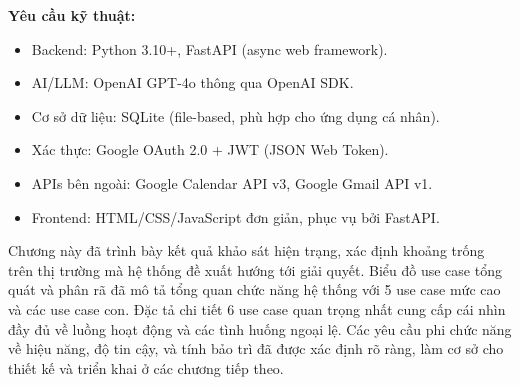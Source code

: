 \documentclass[../DoAn.tex]{subfiles}
\begin{document}
\textbf{Yêu cầu kỹ thuật:}
\begin{itemize}
    \item Backend: Python 3.10+, FastAPI (async web framework).
    \item AI/LLM: OpenAI GPT-4o thông qua OpenAI SDK.
    \item Cơ sở dữ liệu: SQLite (file-based, phù hợp cho ứng dụng cá nhân).
    \item Xác thực: Google OAuth 2.0 + JWT (JSON Web Token).
    \item APIs bên ngoài: Google Calendar API v3, Google Gmail API v1.
    \item Frontend: HTML/CSS/JavaScript đơn giản, phục vụ bởi FastAPI.
\end{itemize}

\vspace{0.5cm}
Chương này đã trình bày kết quả khảo sát hiện trạng, xác định khoảng trống trên thị trường mà hệ thống đề xuất hướng tới giải quyết. Biểu đồ use case tổng quát và phân rã đã mô tả tổng quan chức năng hệ thống với 5 use case mức cao và các use case con. Đặc tả chi tiết 6 use case quan trọng nhất cung cấp cái nhìn đầy đủ về luồng hoạt động và các tình huống ngoại lệ. Các yêu cầu phi chức năng về hiệu năng, độ tin cậy, và tính bảo trì đã được xác định rõ ràng, làm cơ sở cho thiết kế và triển khai ở các chương tiếp theo.
\end{document}
